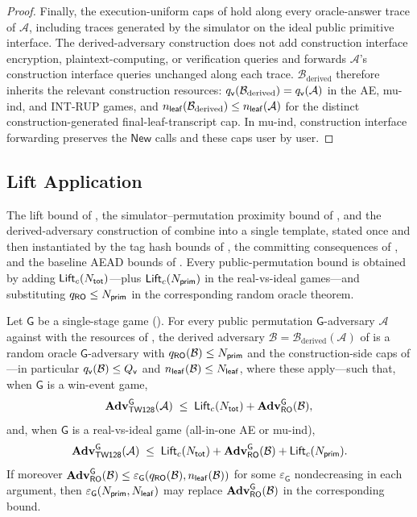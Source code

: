 \begin{proof}
Finally, the execution-uniform caps of  hold
along every oracle-answer trace of $\mathcal{A}$, including traces
generated by the simulator on the ideal public primitive interface.
The derived-adversary construction does not add construction interface
encryption, plaintext-computing, or verification queries and forwards
$\mathcal{A}$'s construction interface queries unchanged along each trace.
$\mathcal{B}_{\mathrm{derived}}$ therefore inherits the relevant
construction resources: $q_{\mathsf{v}}(\mathcal{B}_{\mathrm{derived}}) =
q_{\mathsf{v}}(\mathcal{A})$ in the AE, mu-ind, and \textsf{INT-RUP} games, and
$n_{\mathsf{leaf}}(\mathcal{B}_{\mathrm{derived}}) \leq n_{\mathsf{leaf}}(\mathcal{A})$ for
the distinct construction-generated final-leaf-transcript cap. In
mu-ind, construction interface forwarding preserves the
$\mathsf{New}$ calls and these caps user by user.
\end{proof}

\subsection{Lift Application}
\label{app:lift-corollaries}

The lift bound of , the simulator--permutation
proximity bound of , and the
derived-adversary construction of  combine
into a single template, stated once and then instantiated by the tag hash
bounds of , the committing consequences of
, and the baseline AEAD bounds of
. Every
public-permutation bound is obtained by adding $\mathsf{Lift}_c(N_{\mathsf{tot}})$---plus
$\mathsf{Lift}_c(N_{\mathsf{prim}})$ in the real-vs-ideal games---and
substituting $q_{\mathsf{RO}} \leq N_{\mathsf{prim}}$ in the corresponding random oracle theorem.

\begin{corollary}
\label{cor:lift-application}
Let $\mathsf{G}$ be a single-stage \TW{} game
(). For every
public permutation $\mathsf{G}$-adversary $\mathcal{A}$ against \TW{}
with the resources of , the derived adversary
$\mathcal{B} = \mathcal{B}_{\mathrm{derived}}(\mathcal{A})$ of
 is a random oracle $\mathsf{G}$-adversary
with $q_{\mathsf{RO}}(\mathcal{B}) \leq N_{\mathsf{prim}}$ and the construction-side caps of
---in particular $q_{\mathsf{v}}(\mathcal{B}) \leq Q_{\mathsf{v}}$
and $n_{\mathsf{leaf}}(\mathcal{B}) \leq N_{\mathsf{leaf}}$, where these apply---such that,
when $\mathsf{G}$ is a win-event game,
\[
  \mathbf{Adv}^{\mathsf{G}}_{\textsf{TW128}}(\mathcal{A})
  \;\leq\;
  \mathsf{Lift}_c(N_{\mathsf{tot}}) + \mathbf{Adv}^{\mathsf{G}}_{\mathsf{RO}}(\mathcal{B}),
\]
and, when $\mathsf{G}$ is a real-vs-ideal game (all-in-one AE or mu-ind),
\[
  \mathbf{Adv}^{\mathsf{G}}_{\textsf{TW128}}(\mathcal{A})
  \;\leq\;
  \mathsf{Lift}_c(N_{\mathsf{tot}}) + \mathbf{Adv}^{\mathsf{G}}_{\mathsf{RO}}(\mathcal{B}) + \mathsf{Lift}_c(N_{\mathsf{prim}}).
\]
If moreover $\mathbf{Adv}^{\mathsf{G}}_{\mathsf{RO}}(\mathcal{B}) \leq
\varepsilon_{\mathsf{G}}(q_{\mathsf{RO}}(\mathcal{B}), n_{\mathsf{leaf}}(\mathcal{B}))$ for some
$\varepsilon_{\mathsf{G}}$ nondecreasing in each argument, then
$\varepsilon_{\mathsf{G}}(N_{\mathsf{prim}}, N_{\mathsf{leaf}})$ may replace
$\mathbf{Adv}^{\mathsf{G}}_{\mathsf{RO}}(\mathcal{B})$ in the corresponding bound.
\end{corollary}

